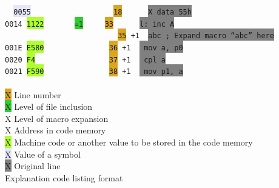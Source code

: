 \documentclass[a4paper,twoside,12pt]{book}
\begin{document}
		\begin{code}[h]
			\verb'  '\texttt{\colorbox{Lavender}{0055}}\verb'                   '\texttt{\colorbox{Goldenrod}{18}}\verb'      '\texttt{\colorbox{Gray}{X      data     55h}} \\
			\texttt{\colorbox{Apricot}{0014}}\verb' '\texttt{\colorbox{GreenYellow}{1122}}\verb'       '\texttt{\colorbox{LimeGreen}{=1}}\verb'     '\texttt{\colorbox{Goldenrod}{33}}\verb'      '\texttt{\colorbox{Gray}{l:     inc      A}} \\
			\verb'                          '\texttt{\colorbox{Goldenrod}{35}}\verb' '\texttt{\colorbox{ProcessBlue}{+1}}\verb'  '\texttt{\colorbox{Gray}{abc     ; Expand macro ``abc'' here}} \\
			\texttt{\colorbox{Apricot}{001E}}\verb' '\texttt{\colorbox{GreenYellow}{E580}}\verb'               '\texttt{\colorbox{Goldenrod}{36}}\verb' '\texttt{\colorbox{ProcessBlue}{+1}}\verb'  '\texttt{\colorbox{Gray}{                mov     a, p0}} \\
			\texttt{\colorbox{Apricot}{0020}}\verb' '\texttt{\colorbox{GreenYellow}{F4}}\verb'                 '\texttt{\colorbox{Goldenrod}{37}}\verb' '\texttt{\colorbox{ProcessBlue}{+1}}\verb'  '\texttt{\colorbox{Gray}{                cpl     a}} \\
			\texttt{\colorbox{Apricot}{0021}}\verb' '\texttt{\colorbox{GreenYellow}{F590}}\verb'               '\texttt{\colorbox{Goldenrod}{38}}\verb' '\texttt{\colorbox{ProcessBlue}{+1}}\verb'  '\texttt{\colorbox{Gray}{                mov     p1, a}} \\\\
			\colorbox{Goldenrod}{\color{Goldenrod}X} Line number \\
			\colorbox{LimeGreen}{\color{LimeGreen}X} Level of file inclusion \\
			\colorbox{ProcessBlue}{\color{ProcessBlue}X} Level of macro expansion \\
			\colorbox{Apricot}{\color{Apricot}X} Address in code memory \\
			\colorbox{GreenYellow}{\color{GreenYellow}X} Machine code or another value to be stored in the code memory \\
			\colorbox{Lavender}{\color{Lavender}X} Value of a symbol \\
			\colorbox{Gray}{\color{Gray}X} Original line \\

			\caption{Explanation code listing format}
		\end{code}
\end{document}
